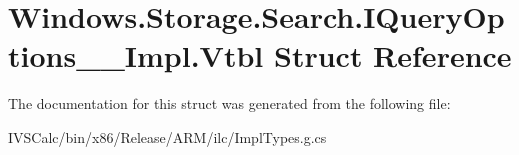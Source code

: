 \hypertarget{struct_windows_1_1_storage_1_1_search_1_1_i_query_options_____impl_1_1_vtbl}{}\section{Windows.\+Storage.\+Search.\+I\+Query\+Options\+\_\+\+\_\+\+Impl.\+Vtbl Struct Reference}
\label{struct_windows_1_1_storage_1_1_search_1_1_i_query_options_____impl_1_1_vtbl}


The documentation for this struct was generated from the following file\+:\begin{DoxyCompactItemize}
\item 
I\+V\+S\+Calc/bin/x86/\+Release/\+A\+R\+M/ilc/Impl\+Types.\+g.\+cs\end{DoxyCompactItemize}
